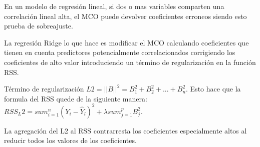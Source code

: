 En un modelo de regresión lineal, si dos o mas variables comparten una correlación lineal alta, el MCO puede devolver coeficientes erroneos siendo esto prueba de sobreajuste. 

La regresión Ridge lo que hace es modificar el MCO calculando coeficientes que tienen en cuenta predictores potencialmente correlacionados corrigiendo los coeficientes de alto valor introduciendo un término de regularización en la función RSS.

Término de regularización $L2 = ||B||^2 = B_1^2 + B_2^2 + ... + B_n^2$. Esto hace que la formula del RSS quede de la siguiente manera:
$RSS_L2 = sum_{i=1}^{n} (Y_i - \hat{Y}_l)^2 + \lambda sum_{j=1}^{p} B_j^2$.

La agregación del L2 al RSS contrarresta los coeficientes especialmente altos al reducir todos los valores de los coeficientes.